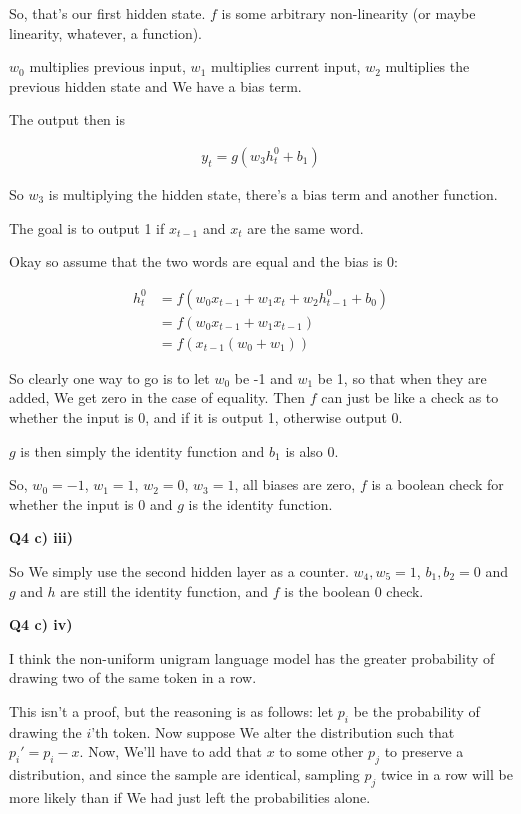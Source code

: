 \documentclass{article}
\begin{document}
	So, that's our first hidden state. $f$ is some arbitrary non-linearity (or maybe linearity, whatever, a function).
	
	$w_0$ multiplies previous input, $w_1$ multiplies current input, $w_2$ multiplies the previous hidden state and We have a bias term. 
	
	The output then is
	
	\begin{align}
		y_t = g(w_3h^0_t + b_1)
	\end{align}
	
	So $w_3$ is multiplying the hidden state, there's a bias  term and another function. 
	
	The goal is to output 1 if $x_{t-1}$ and $x_t$ are the same word.
	
	Okay so assume that  the two words are equal and the bias is 0:
	
	\begin{align}
		h^0_t &= f(w_0x_{t-1} + w_1 x_t + w_2h^0_{t-1} + b_0)\\
		&= f(w_0x_{t-1} + w_1 x_{t-1})\\
		&= f(x_{t-1}(w_0+w_1))
	\end{align}
	
	So clearly one way to go is to let $w_0$ be -1 and $w_1$ be 1, so that when they are added, We get zero in the case of equality. Then $f$ can just be like a check as to whether the input is 0, and if it is output 1, otherwise output 0.
	
	$g$ is then simply the identity function and $b_1$ is also 0.
	
	So, $w_0 = -1$, $w_1 = 1$, $w_2 = 0$, $w_3=1$, all biases are zero, $f$ is a boolean check for whether the input is $0$ and $g$ is the identity function.
	
\textbf{Q4 c) iii)}	

	So We simply use the second hidden layer as a counter. $w_4, w_5=1$, $b_1, b_2 = 0$ and $g$ and $h$ are still the identity function, and $f$ is the boolean 0 check.	

\textbf{Q4 c) iv)}		
	
	I think the non-uniform unigram language model has the greater probability of drawing two of the same token in a row. 
	
	This isn't a proof, but the reasoning is as follows: let $p_i$ be the probability of drawing the $i$'th token. Now suppose We alter the distribution such that $p_i' = p_i - x$. Now, We'll have to add that $x$ to some other $p_j$ to preserve a distribution, and since the sample are identical, sampling $p_j$ twice in a row will be more likely than if We had just left the probabilities alone.
	
\end{document}

